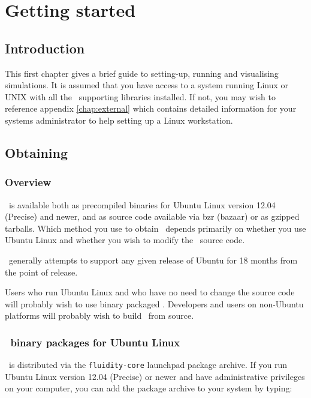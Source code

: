 \chapter{Getting started}\label{chap:gettingstarted}

\section{Introduction} This first chapter gives a brief guide to setting-up,
running and visualising simulations. It is assumed that you have access to a
system running Linux or UNIX with all the \fluidity\ supporting libraries
installed. If not, you may wish to reference appendix \ref{chap:external} which
contains detailed information for your systems administrator to help setting up
a Linux workstation. 

\section{Obtaining \fluidity}
\label{sec:obtaining_fluidity}

\subsection{Overview}
\label{sec:obtaining_fluidity_overview}

\fluidity\ is available both as precompiled binaries for Ubuntu Linux version
12.04 (Precise) and newer, and as source code available via bzr (bazaar) or as
gzipped tarballs. Which method you use to obtain \fluidity\ depends primarily on
whether you use Ubuntu Linux and whether you wish to modify the \fluidity\
source code. 

\fluidity\ generally attempts to support any given release of Ubuntu for 18
months from the point of release.

Users who run Ubuntu Linux and who have no need to change the source code will
probably wish to use binary packaged \fluidity. Developers and users on
non-Ubuntu platforms will probably wish to build \fluidity\ from source.

\subsection{\fluidity\ binary packages for Ubuntu Linux}

\fluidity\ is distributed via the \lstinline[language=Bash]+fluidity-core+
launchpad package archive. If you run Ubuntu Linux version 12.04 (Precise) or
newer and have administrative privileges on
your computer, you can add the package archive to your system by typing:

